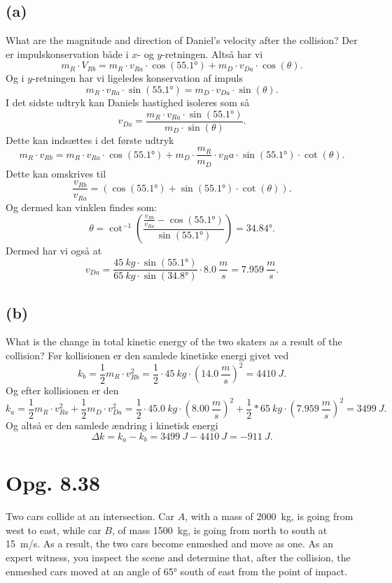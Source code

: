\documentclass[12pt]{article}
\begin{document}
\subsection*{(a)}
What are the magnitude and direction of Daniel’s velocity after the collision?
\bigbreak
Der er impulskonservation både i $x$- og $y$-retningen. Altså har vi
\[
m_R\cdot V_{Rb} = m_R\cdot v_{Ra}\cdot \cos(\ang{55,1}) + m_D \cdot v_{Da} \cdot \cos(\theta)
.\]
Og i $y$-retningen har vi ligeledes konservation af impuls
\[
m_R\cdot v_{Ra}\cdot \sin(\ang{55,1}) = m_D\cdot v_{Da}\cdot \sin(\theta)
.\] 
I det sidste udtryk kan Daniels hastighed isoleres som så
\[
v_{Da} = \frac{m_R\cdot v_{Ra}\cdot \sin(\ang{55,1})}{m_D\cdot \sin(\theta)}
.\]
Dette kan indsættes i det første udtryk
\[
m_R\cdot v_{Rb} = m_R\cdot v_{Ra}\cdot \cos(\ang{55,1}) + m_D \cdot \frac{m_R}{m_D}\cdot v_Ra\cdot \sin(\ang{55,1})\cdot \cot(\theta)
.\] 
Dette kan omskrives til
\[
\frac{v_{Rb}}{v_{Ra}} = \left( \cos(\ang{55,1})+\sin(\ang{55,1})\cdot \cot(\theta) \right) 
.\] 
Og dermed kan vinklen findes som:
\[
\theta = \cot^{-1}\left(\frac{ \frac{v_{Rb}}{v_{Ra}} - \cos(\ang{55,1}) }{\sin(\ang{55,1})}\right) = \ang{34,84}
.\] 
Dermed har vi også at
\[
v_{Da} = \frac{\qty{45}{kg}\cdot \sin(\ang{55,1})}{\qty{65}{kg}\cdot \sin(\ang{34,8})}\cdot \qty{8,0}{\frac{m}{s}} = \qty{7,959}{\frac{m}{s}}
.\] 

\subsection*{(b)}
What is the change in total kinetic energy of the two skaters as a result of the collision?
\bigbreak
Før kollisionen er den samlede kinetiske energi givet ved
\[
k_b = \frac{1}{2}m_R\cdot v_{Rb}^2 = \frac{1}{2}\cdot \qty{45}{kg}\cdot \left( \qty{14,0}{\frac{m}{s}} \right)^2 = \qty{4410}{J}
.\] 
Og efter kollisionen er den
\[
k_a = \frac{1}{2}m_R\cdot v_{Ra}^2 + \frac{1}{2}m_D\cdot v_{Da}^2 = \frac{1}{2}\cdot \qty{45,0}{kg}\cdot \left( \qty{8,00}{\frac{m}{s}} \right)^2 + \frac{1}{2}*\qty{65}{kg}\cdot (\qty{7,959}{\frac{m}{s}})^2 = \qty{3499}{J}
.\] 
Og altså er den samlede ændring i kinetisk energi
\[
\Delta k = k_a - k_b = \qty{3499}{J} - \qty{4410}{J}  = \qty{-911}{J}
.\] 

\section*{Opg. 8.38}
Two cars collide at an intersection. Car $A$, with a mass of \qty{2000}{kg}, is going from west to east, while car $B$, of mass \qty{1500}{kg}, is going from north to south at \qty{15}{m/s}. As a result, the two cars become enmeshed and move as one. As an expert witness, you inspect the scene and determine that, after the collision, the enmeshed cars moved at an angle of \ang{65} south of east from the point of impact.
\end{document}
